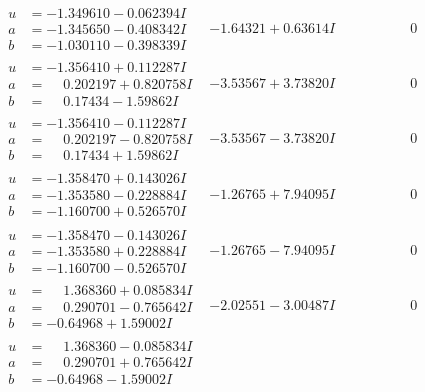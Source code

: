 \documentclass[1p]{elsarticle_modified}
\theoremstyle{definition}
\begin{document}
$$\begin{array}{c|c|c}
 \hline 
\begin{aligned}
u &= -1.349610 - 0.062394 I \\
a &= -1.345650 - 0.408342 I \\
b &= -1.030110 - 0.398339 I\end{aligned}
 & -1.64321 + 0.63614 I & \phantom{-0.000000 } 0 \\ \hline\begin{aligned}
u &= -1.356410 + 0.112287 I \\
a &= \phantom{-}0.202197 + 0.820758 I \\
b &= \phantom{-}0.17434 - 1.59862 I\end{aligned}
 & -3.53567 + 3.73820 I & \phantom{-0.000000 } 0 \\ \hline\begin{aligned}
u &= -1.356410 - 0.112287 I \\
a &= \phantom{-}0.202197 - 0.820758 I \\
b &= \phantom{-}0.17434 + 1.59862 I\end{aligned}
 & -3.53567 - 3.73820 I & \phantom{-0.000000 } 0 \\ \hline\begin{aligned}
u &= -1.358470 + 0.143026 I \\
a &= -1.353580 - 0.228884 I \\
b &= -1.160700 + 0.526570 I\end{aligned}
 & -1.26765 + 7.94095 I & \phantom{-0.000000 } 0 \\ \hline\begin{aligned}
u &= -1.358470 - 0.143026 I \\
a &= -1.353580 + 0.228884 I \\
b &= -1.160700 - 0.526570 I\end{aligned}
 & -1.26765 - 7.94095 I & \phantom{-0.000000 } 0 \\ \hline\begin{aligned}
u &= \phantom{-}1.368360 + 0.085834 I \\
a &= \phantom{-}0.290701 - 0.765642 I \\
b &= -0.64968 + 1.59002 I\end{aligned}
 & -2.02551 - 3.00487 I & \phantom{-0.000000 } 0 \\ \hline\begin{aligned}
u &= \phantom{-}1.368360 - 0.085834 I \\
a &= \phantom{-}0.290701 + 0.765642 I \\
b &= -0.64968 - 1.59002 I\end{aligned}

\end{array}$$
\end{document}
